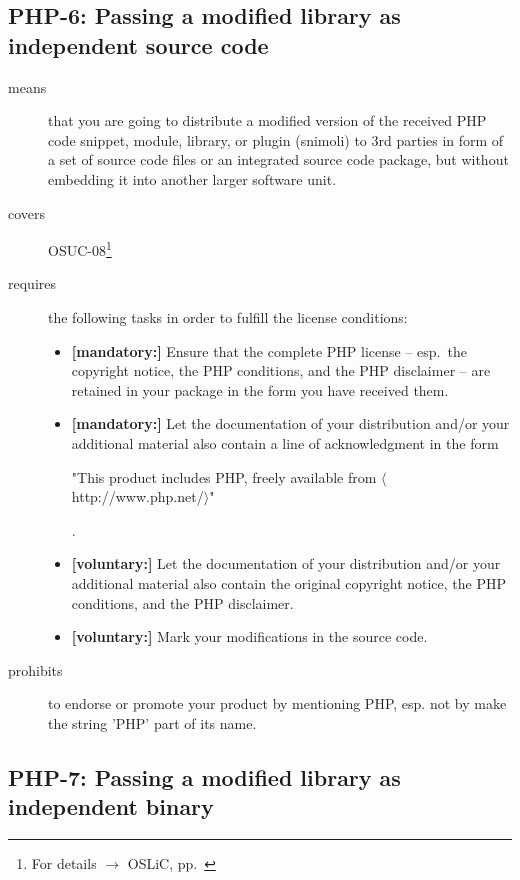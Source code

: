 \subsection{PHP-6: Passing a modified library as independent source code}
\label{OSUC-08-PHP}
\begin{description}
\item[means] that you are going to distribute a modified version of the received
PHP code snippet, module, library, or plugin (snimoli) to 3rd parties in form
of a set of source code files or an integrated source code package, but without
embedding it into another larger software unit.
\item[covers] OSUC-08\footnote{For details $\rightarrow$ OSLiC, pp.\ \pageref{OSUC-08-DEF}}
\item[requires] the following tasks in order to fulfill the license conditions:
\begin{itemize}
  
  \item \textbf{[mandatory:]} Ensure that the complete PHP license -- esp.\
  the copyright notice, the PHP conditions, and the PHP disclaimer -- are
  retained in your package in the form you have received them.
  
  \item \textbf{[mandatory:]} Let the documentation of your distribution and/or
  your additional material also contain a line of acknowledgment in the form
  \begin{footnotesize}"This product includes PHP, freely available from
  $\langle$http://www.php.net/$\rangle$"\end{footnotesize}.
    
  \item \textbf{[voluntary:]} Let the documentation of your distribution and/or
  your additional material also contain the original copyright notice, the PHP
  conditions, and the PHP disclaimer.
     
  \item \textbf{[voluntary:]} Mark your modifications in the source code.
  
\end{itemize}

\item[prohibits] to endorse or promote your product by mentioning PHP, esp. not
by make the string 'PHP' part of its name.

\end{description}


\subsection{PHP-7: Passing a modified library as independent binary}

